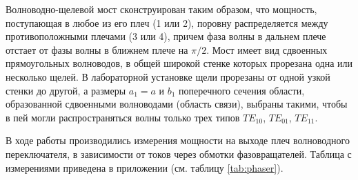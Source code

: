 Волноводно-щелевой мост сконструирован таким образом, что мощность, поступающая в любое из его плеч (1 или 2), поровну распределяется между противоположными плечами (3 или 4), причем фаза волны в дальнем плече отстает от фазы волны в ближнем плече на $\pi/2$. Мост имеет вид сдвоенных прямоугольных волноводов, в общей широкой стенке которых прорезана одна
 или несколько щелей. В лабораторной установке щели прорезаны от одной узкой стенки до другой, а размеры $a_1=a$ и $b_1$ поперечного сечения области, образованной сдвоенными волноводами (область связи), выбраны такими, чтобы в пей могли распространяться волны только трех типов $TE_{10}$, $TE_{01}$, $TE_{11}$.

В ходе работы производились измерения мощности на выходе плеч волноводного переключателя, в зависимости от
токов через обмотки фазовращателей. Таблица с измерениями приведена в приложении (см. таблицу \ref{tab:phaser}).

